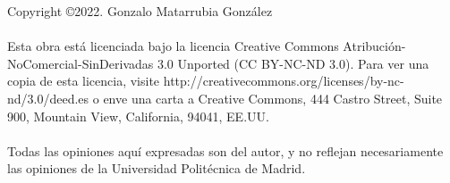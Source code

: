 \begin{flushleft}

Copyright \copyright 2022. Gonzalo Matarrubia González


\paragraph{} Esta obra está licenciada bajo la licencia
Creative Commons Atribución-NoComercial-SinDerivadas 3.0 Unported (CC BY-NC-ND 3.0).
Para ver una copia de esta licencia, visite http://creativecommons.org/licenses/by-nc-nd/3.0/deed.es
o enve una carta a Creative Commons, 444 Castro Street, Suite 900, Mountain View, California,
 94041, EE.UU.

\paragraph{} Todas las opiniones aquí expresadas son del autor, y no reflejan necesariamente las opiniones
de la Universidad Politécnica de Madrid.

\end{flushleft}